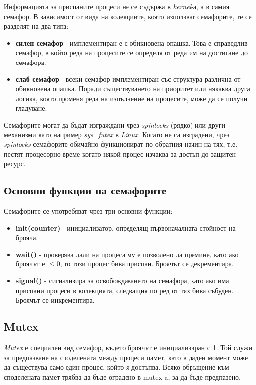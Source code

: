 \documentclass[fleqn,12pt]{article}
\begin{document}
Информацията за приспаните процеси не се съдържа в \textit{kernel}-а, а в самия семафор.
\bigbreak
В зависимост от вида на колекциите, която използват семафорите, те се разделят на два типа:

\begin{itemize}
    \item \textbf{силен семафор} - имплементиран е с обикновена опашка. Това е справедлив семафор, в който реда на процесите се определя от реда им на достигане до семафора.
    \item \textbf{слаб семафор} - всеки семафор имплементиран със структура различна от обикновена опашка. Поради съществуването на приоритет или някаква друга логика, която променя реда на изпълнение на процесите, може да се получи гладуване.
\end{itemize}
    
Семафорите могат да бъдат изграждани чрез \textit{spinlocks} (рядко) или други механизми като например \textit{sys\_futex} в \textit{Linux}.
Когато не са изградени, чрез \textit{spinlocks} семафорите обичайно функционират по обратния начин на тях, т.е. пестят процесорно време когато някой процес изчаква за достъп до защитен ресурс.

\subsection{Основни функции на семафорите}

Семафорите се употребяват чрез три основни функции:

\begin{itemize}
    \item \textbf{init(counter)} - инициализатор, определящ първоначалната стойност на брояча.
    \item \textbf{wait()} - проверява дали на процеса му е позволено да премине, като ако броячът е $\leq 0$, то този процес бива приспан. Броячът се декрементира.
    \item \textbf{signal()} - сигнализира за освобождаването на семафора, като ако има приспани процеси в колекцията, следващия по ред от тях бива събуден. Броячът се инкрементира.
\end{itemize}

\subsection{Mutex}

\textit{Mutex} е специален вид семафор, където броячът е инициализиран с 1.
Той служи за предпазване на споделената между процеси памет, като в даден момент може да съществува само един процес, който я достъпва.
Всяко обръщение към споделената памет трябва да бъде оградено в mutex-a, за да бъде предпазено.
\end{document}
